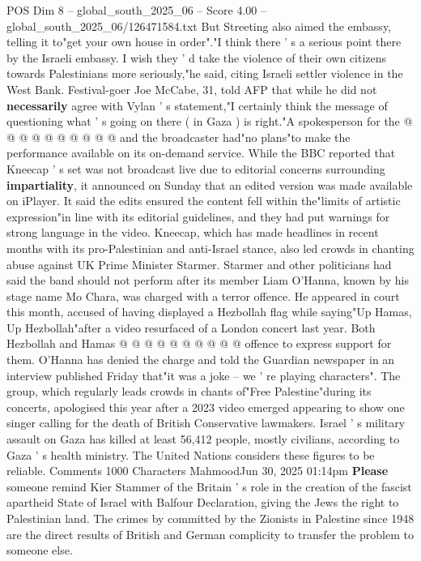 \begin{textsample}{POS Dim 8 – global\_south\_2025\_06 – Score 4.00 – global\_south\_2025\_06/126471584.txt}
But Streeting also aimed the embassy, telling it to"get your own house in order"."I think there ' s a serious point there by the Israeli embassy.
I wish they ' d take the violence of their own citizens towards Palestinians more seriously,"he said, citing Israeli settler violence in the West Bank.
Festival-goer Joe McCabe, 31, told AFP that while he did not \textbf{necessarily} agree with Vylan ' s statement,"I certainly think the message of questioning what ' s going on there ( in Gaza ) is right."A spokesperson for the @ @ @ @ @ @ @ @ @ @ and the broadcaster had"no plans"to make the performance available on its on-demand service.
While the BBC reported that Kneecap ' s set was not broadcast live due to editorial concerns surrounding \textbf{impartiality}, it announced on Sunday that an edited version was made available on iPlayer.
It said the edits ensured the content fell within the"limits of artistic expression"in line with its editorial guidelines, and they had put warnings for strong language in the video.
Kneecap, which has made headlines in recent months with its pro-Palestinian and anti-Israel stance, also led crowds in chanting abuse against UK Prime Minister Starmer.
Starmer and other politicians had said the band should not perform after its member Liam O'Hanna, known by his stage name Mo Chara, was charged with a terror offence.
He appeared in court this month, accused of having displayed a Hezbollah flag while saying"Up Hamas, Up Hezbollah"after a video resurfaced of a London concert last year.
Both Hezbollah and Hamas @ @ @ @ @ @ @ @ @ @ offence to express support for them.
O'Hanna has denied the charge and told the Guardian newspaper in an interview published Friday that"it was a joke -- we ' re playing characters".
The group, which regularly leads crowds in chants of"Free Palestine"during its concerts, apologised this year after a 2023 video emerged appearing to show one singer calling for the death of British Conservative lawmakers.
Israel ' s military assault on Gaza has killed at least 56,412 people, mostly civilians, according to Gaza ' s health ministry.
The United Nations considers these figures to be reliable.
Comments 1000 Characters MahmoodJun 30, 2025 01:14pm \textbf{Please} someone remind Kier Stammer of the Britain ' s role in the creation of the fascist apartheid State of Israel with Balfour Declaration, giving the Jews the right to Palestinian land.
The crimes by committed by the Zionists in Palestine since 1948 are the direct results of British and German complicity to transfer the problem to someone else.

\end{textsample}
